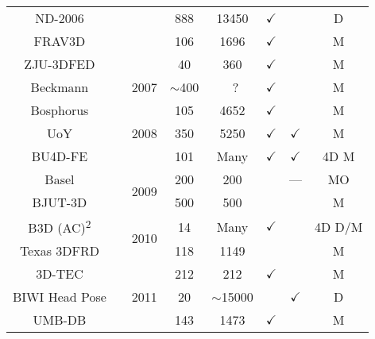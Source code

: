 \begin{table}[t]
{\begin{tabular}{@{}cccccccc@{}}
ND-2006                     &\cite{faltemier2007using}      &                       & 888         & 13450       & $\checkmark$ &              & D      \\
FRAV3D                      &\cite{conde2006multimodal}     &                       & 106         & 1696        & $\checkmark$ &              & M      \\
ZJU-3DFED                   &\cite{wang2006exploring}       &                       & 40          & 360         & $\checkmark$ &              & M      \\ \midrule
Beckmann                    &\cite{hu2007building}          & 2007                  & $\sim$400   &~?           & $\checkmark$ &              & M      \\ \midrule
Bosphorus                   &\cite{Savran:2008gg}           & \multirow{3}{*}{2008} & 105         & 4652        & $\checkmark$ &              & M      \\
UoY                         &\cite{heseltine2008three}      &                       & 350         & 5250        & $\checkmark$ & $\checkmark$ & M      \\
BU4D-FE                     &\cite{yin2008high}             &                       & 101         & Many        & $\checkmark$ & $\checkmark$ & 4D M   \\ \midrule
Basel                       &\cite{paysan20093d}            & \multirow{2}{*}{2009} & 200         & 200         &              & ---          & MO     \\
BJUT-3D                     &\cite{baocai2009bjut}          &                       & 500         & 500         &              &              & M      \\ \midrule
B3D (AC)\textsuperscript{2} &\cite{fanelli20103}            & \multirow{2}{*}{2010} & 14          & Many        & $\checkmark$ &              & 4D D/M \\
Texas 3DFRD                 &\cite{gupta2010anthropometric} &                       & 118         & 1149        &              &              & M      \\ \midrule
3D-TEC                      &\cite{vijayan2011twins}        & \multirow{3}{*}{2011} & 212         & 212         & $\checkmark$ &              & M      \\
BIWI Head Pose              &\cite{fanelli2013random}       &                       & 20          & $\sim$15000 &              & $\checkmark$ & D      \\
UMB-DB                      &\cite{colombo2011umb}          &                       & 143         & 1473        & $\checkmark$ &              & M      \\ \midrule

\end{tabular}}
\end{table}
